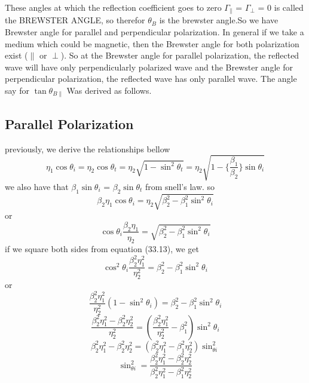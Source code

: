 These angles at which the reflection coefficient goes to zero $\Gamma_\parallel$ = $\Gamma_\perp$ = 0 is called the BREWSTER ANGLE, so therefor $\theta_B$ is the brewster angle.So we have Brewster angle for parallel and perpendicular polarization. In general if we take a medium which could be magnetic, then the Brewster angle for both polarization exist ($\parallel$ or $\perp$). So at the Brewster angle for parallel polarization, the reflected wave will have only perpendicularly polarized wave and the Brewster angle for perpendicular polarization, the reflected wave has only parallel wave. The angle say for $\tan\theta_{B\parallel}$ Was derived as follows.
\subsection{Parallel Polarization}
previously, we derive the relationships bellow
\begin{dmath}
\eta_1\cos\theta_i = \eta_2\cos\theta_t  = \eta_2\sqrt{1 - \sin^2\theta_t} = \eta_2\sqrt{1- \Bigg\{\dfrac{\beta_1}{\beta_2}\Bigg\}\sin\theta_i}
\end{dmath}
we also have that $\beta_1\sin\theta_i$ = $\beta_2\sin\theta_t$ from snell's law. so
\begin{equation*}
\beta_2\eta_1\cos\theta_i = \eta_2\sqrt{\beta_2^2-\beta_1^2\sin^2\theta_i}
\end{equation*}
or
\begin{equation}
\cos\theta_i\dfrac{\beta_2\eta_1}{\eta_2} = \sqrt{\beta_2^2-\beta_1^2\sin^2\theta_i}
\end{equation}
if we square both sides from equation (33.13), we get
\begin{equation*}
\cos^2\theta_i \dfrac{\beta^2_2\eta^2_1}{\eta^2_2} = \beta^2_2 - \beta^2_1\sin^2\theta_i
\end{equation*}
or
\begin{equation}
\dfrac{\beta^2_2\eta^2_1}{\eta^2_2}(1 - \sin^2\theta_i) = \beta^2_2 - \beta^2_1\sin^2\theta_i
\end{equation}
\begin{equation*}
\dfrac{\beta^2_2\eta^2_1 - \beta^2_2\eta^2_2}{\eta^2_2} = (\dfrac{\beta^2_2\eta^2_1}{\eta^2_2} - \beta^2_1)\sin^2\theta_i
\end{equation*}
\begin{equation*}
\beta^2_2\eta^2_1 - \beta^2_2\eta^2_2 = (\beta^2_2\eta^2_1 - \beta^2_1\eta^2_2)\sin^2_{\theta i}
\end{equation*}
\begin{equation}
\sin^2_{\theta i} = \dfrac{\beta^2_2\eta^2_1 - \beta^2_2\eta^2_2}{\beta^2_2\eta^2_1 - \beta^2_1\eta^2_2}
\end{equation}
